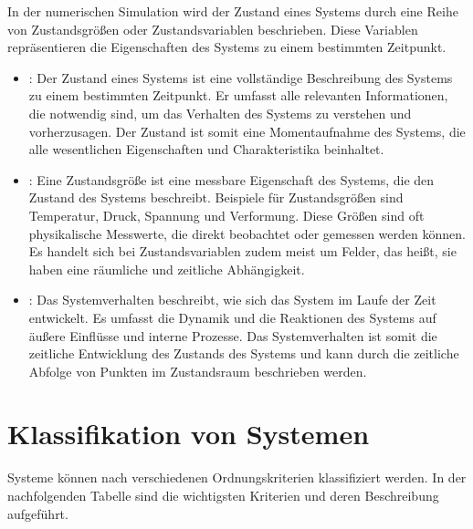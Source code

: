 \documentclass[letterpaper,10pt,german]{jupyterBook}
\begin{document}
\sphinxAtStartPar
{}

\sphinxAtStartPar
In der numerischen Simulation wird der Zustand eines Systems durch eine Reihe von Zustandsgrößen oder Zustandsvariablen beschrieben. Diese Variablen repräsentieren die Eigenschaften des Systems zu einem bestimmten Zeitpunkt.
\begin{itemize}
\item {} 
\sphinxAtStartPar
{}: Der Zustand eines Systems ist eine vollständige Beschreibung des Systems zu einem bestimmten Zeitpunkt. Er umfasst alle relevanten Informationen, die notwendig sind, um das Verhalten des Systems zu verstehen und vorherzusagen. Der Zustand ist somit eine Momentaufnahme des Systems, die alle wesentlichen Eigenschaften und Charakteristika beinhaltet.

\item {} 
\sphinxAtStartPar
{}: Eine Zustandsgröße ist eine messbare Eigenschaft des Systems, die den Zustand des Systems beschreibt. Beispiele für Zustandsgrößen sind Temperatur, Druck, Spannung und Verformung. Diese Größen sind oft physikalische Messwerte, die direkt beobachtet oder gemessen werden können. Es handelt sich bei Zustandsvariablen zudem meist um Felder, das heißt, sie haben eine räumliche und zeitliche Abhängigkeit.

\item {} 
\sphinxAtStartPar
{}: Das Systemverhalten beschreibt, wie sich das System im Laufe der Zeit entwickelt. Es umfasst die Dynamik und die Reaktionen des Systems auf äußere Einflüsse und interne Prozesse. Das Systemverhalten ist somit die zeitliche Entwicklung des Zustands des Systems und kann durch die zeitliche Abfolge von Punkten im Zustandsraum beschrieben werden.

\end{itemize}




\section{Klassifikation von Systemen}
\label{\detokenize{chapters/chapter1/Einf_xfchrung_Konstruktion:klassifikation-von-systemen}}
\sphinxAtStartPar
Systeme können nach verschiedenen Ordnungskriterien klassifiziert werden. In der nachfolgenden Tabelle sind die wichtigsten Kriterien und deren Beschreibung aufgeführt.
\end{document}
